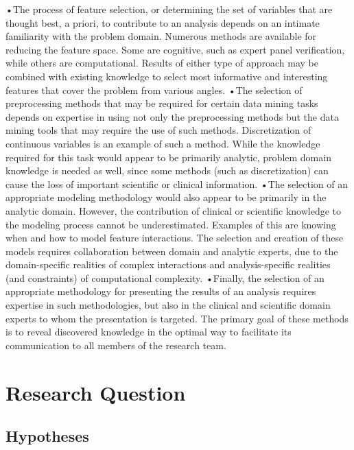 \documentclass[10pt,a4paper]{article}
\begin{document}
	•The process of feature selection, or determining the set of variables that are thought best, a priori, to contribute to an analysis depends on an intimate familiarity with the problem domain. Numerous methods are available for reducing the feature space. Some are cognitive, such as expert panel verification, while others are computational. Results of either type of approach may be combined with existing knowledge to select most informative and interesting features that cover the problem from various angles.
	•The selection of preprocessing methods that may be required for certain data mining tasks depends on expertise in using not only the preprocessing methods but the data mining tools that may require the use of such methods. Discretization of continuous variables is an example of such a method. While the knowledge required for this task would appear to be primarily analytic, problem domain knowledge is needed as well, since some methods (such as discretization) can cause the loss of important scientific or clinical information.
	•The selection of an appropriate modeling methodology would also appear to be primarily in the analytic domain. However, the contribution of clinical or scientific knowledge to the modeling process cannot be underestimated. Examples of this are knowing when and how to model feature interactions. The selection and creation of these models requires collaboration between domain and analytic experts, due to the domain-specific realities of complex interactions and analysis-specific realities (and constraints) of computational complexity.
	•Finally, the selection of an appropriate methodology for presenting the results of an analysis requires expertise in such methodologies, but also in the clinical and scientific domain experts to whom the presentation is targeted. The primary goal of these methods is to reveal discovered knowledge in the optimal way to facilitate its communication to all members of the research team.\cite{zupan2006knowledge}
	
	\section{Research Question}
	
	\subsection{Hypotheses}
	
	 
	
	
\end{document}
